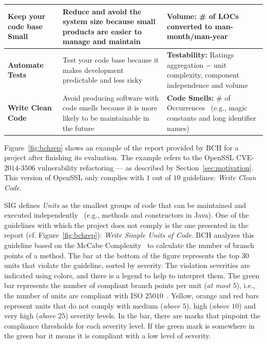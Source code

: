 \documentclass[10pt,conference]{IEEEtran}
\begin{document}
\begin{table}[h]
\begin{tabular}{L{1.66cm}L{3.3cm}L{2.7cm}}
\textbf{Keep your code base Small} & Reduce and avoid the system size because
small products are easier to manage and maintain & \textbf{Volume:} \# of LOCs converted 
to man-month/man-year~\cite{criteria:2017} \\\midrule

\textbf{Automate Tests} & Test your code base because it makes development
predictable and less risky & \textbf{Testability:} Ratings aggregation $-$ unit 
complexity, component independence and volume~\cite{Visser:2016:OREILLY}
 \\\midrule

\textbf{Write Clean Code} & Avoid producing software with code smells because
it is more likely to be maintainable in the future & \textbf{Code Smells:} 
\# of Occurrences~\cite{Visser:2016:OREILLY} (e.g., magic constants and long 
identifier names) \\
\bottomrule
\end{tabular}
\label{tab:guidelines}
\end{table}


Figure~\ref{fig:bchrep} shows an example of the report
provided by BCH for a project after finishing its evaluation. The example
refers to the OpenSSL CVE-$2014$-$3506$ vulnerability refactoring ---
as described by Section~\ref{sec:motivation}. This
version of OpenSSL only complies with $1$ out of $10$ guidelines: \emph{Write
Clean Code}.

SIG defines \emph{Units} as the smallest groups of code that can be maintained
and executed independently~\cite{Visser:2016:OREILLY} (e.g., methods and
constructors in Java). One of the guidelines with which the project does not
comply is the one presented in the report (cf. Figure~\ref{fig:bchrep}):
\emph{Write Simple Units of Code}. BCH analyzes this guideline based on the
McCabe Complexity~\cite{1702388} to calculate the number of branch points of a
method. The bar at the bottom of the figure represents the top $30$ units that
violate the guideline, sorted by severity. The violation severities are
indicated using colors, and there is a legend to help to interpret them. The
green bar represents the number of compliant branch points per unit (\emph{at
most $5$}), i.e., the number of units are compliant with ISO
$25010$~\cite{iso:2011}. Yellow, orange and red bars represent units that do not
comply with medium (\emph{above $5$}), high (\emph{above $10$}) and very high
(\emph{above $25$}) severity levels. In the bar, there are marks that pinpoint
the compliance thresholds for each severity level. If the green mark is
somewhere in the green bar it means it is compliant with a low level of
severity.
\end{document}
